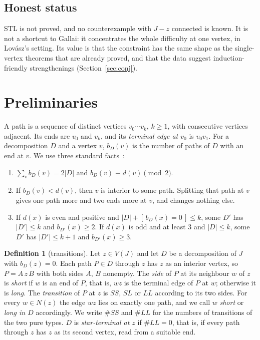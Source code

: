 \documentclass[11pt]{amsart}
\theoremstyle{definition}
\newtheorem{definition}[theorem]{Definition}
\newcommand{\ind}[1]{[\,#1\,]}
\begin{document}
\subsection*{Honest status}
STL is not proved, and no counterexample with $J-z$ connected is known. It is not a shortcut to
Gallai: it concentrates the whole difficulty at one vertex, in Lov\'asz's setting. Its value is
that the constraint has the same shape as the single-vertex theorems that are already proved, and
that the data suggest induction-friendly strengthenings (Section~\ref{sec:conj}).

\section{Preliminaries}\label{sec:prelim}

A path is a sequence of distinct vertices $v_0\cdots v_k$, $k\ge1$, with consecutive vertices
adjacent. Its ends are $v_0$ and $v_k$, and its \emph{terminal edge at $v_0$} is $v_0v_1$. For a
decomposition $D$ and a vertex $v$, $b_D(v)$ is the number of paths of $D$ with an end at $v$. We
use three standard facts~\cite[Lemmas~2.2--2.4]{SP}:
\begin{enumerate}[label=(F\arabic*)]
\item $\sum_vb_D(v)=2|D|$ and $b_D(v)\equiv d(v)\pmod 2$.
\item If $b_D(v)<d(v)$, then $v$ is interior to some path. Splitting that path at $v$ gives one
path more and two ends more at $v$, and changes nothing else.
\item If $d(x)$ is even and positive and $|D|+\ind{b_D(x)=0}\le k$, some $D'$ has $|D'|\le k$ and
$b_{D'}(x)\ge2$. If $d(x)$ is odd and at least $3$ and $|D|\le k$, some $D'$ has $|D'|\le k+1$ and
$b_{D'}(x)\ge3$.
\end{enumerate}

\begin{definition}[transitions]\label{def:trans}
Let $z\in V(J)$ and let $D$ be a decomposition of $J$ with $b_D(z)=0$. Each path $P\in D$ through
$z$ has $z$ as an interior vertex, so $P=A\,z\,B$ with both sides $A$, $B$ nonempty. The
\emph{side} of $P$ at its neighbour $w$ of $z$ is \emph{short} if $w$ is an end of $P$, that is,
$wz$ is the terminal edge of $P$ at $w$; otherwise it is \emph{long}. The \emph{transition} of $P$
at $z$ is $SS$, $SL$ or $LL$ according to its two sides. For every $w\in N(z)$ the edge $wz$ lies
on exactly one path, and we call $w$ \emph{short} or \emph{long in $D$} accordingly. We write
$\#SS$ and $\#LL$ for the numbers of transitions of the two pure types. $D$ is
\emph{star-terminal at $z$} if $\#LL=0$, that is, if every path through $z$ has $z$ as its second
vertex, read from a suitable end.
\end{definition}
\end{document}
